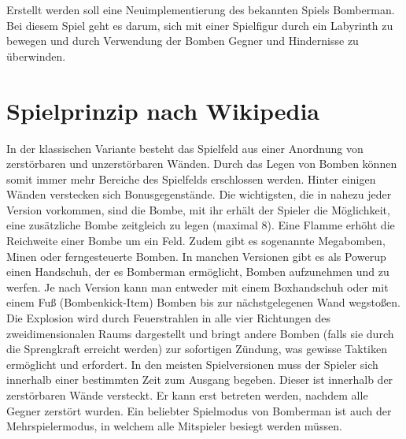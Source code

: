 \documentclass{programmierpraktikum}
\subtitle{Bomberman}
\begin{document}
\maketitle
Erstellt werden soll eine Neuimplementierung des bekannten Spiels Bomberman. Bei diesem Spiel
geht es darum, sich mit einer Spielfigur durch ein Labyrinth zu bewegen und durch Verwendung der
Bomben Gegner und Hindernisse zu überwinden.
%
\section{Spielprinzip nach Wikipedia}
In der klassischen Variante besteht das Spielfeld aus einer Anordnung von zerstörbaren und
unzerstörbaren Wänden. Durch das Legen von Bomben können somit immer mehr Bereiche des
Spielfelds erschlossen werden. Hinter einigen Wänden verstecken sich Bonusgegenstände. Die
wichtigsten, die in nahezu jeder Version vorkommen, sind die Bombe, mit ihr erhält der Spieler die
Möglichkeit, eine zusätzliche Bombe zeitgleich zu legen (maximal 8). Eine Flamme erhöht die
Reichweite einer Bombe um ein Feld. Zudem gibt es sogenannte Megabomben, Minen oder
ferngesteuerte Bomben. In manchen Versionen gibt es als Powerup einen Handschuh, der es
Bomberman ermöglicht, Bomben aufzunehmen und zu werfen. Je nach Version kann man entweder
mit einem Boxhandschuh oder mit einem Fuß (Bombenkick-Item) Bomben bis zur nächstgelegenen
Wand wegstoßen.
Die Explosion wird durch Feuerstrahlen in alle vier Richtungen des zweidimensionalen Raums
dargestellt und bringt andere Bomben (falls sie durch die Sprengkraft erreicht werden) zur
sofortigen Zündung, was gewisse Taktiken ermöglicht und erfordert. In den meisten Spielversionen
muss der Spieler sich innerhalb einer bestimmten Zeit zum Ausgang begeben. Dieser ist innerhalb
der zerstörbaren Wände versteckt. Er kann erst betreten werden, nachdem alle Gegner zerstört
wurden.
Ein beliebter Spielmodus von Bomberman ist auch der Mehrspielermodus, in welchem alle
Mitspieler besiegt werden müssen.
%
\end{document}
